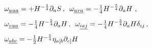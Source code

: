 \begin{equation}
\begin{array}{ll}
\omega _{%
\underline{u}\underline{u}\underline{a}}=+H^{-{\frac{1}{4}}}\partial _{a}S\,,\,\,\,
\omega _{\underline{uva}}=-{\frac{1}{4}}H^{-{\frac{5}{4}}}\partial _{a}H\,\,,\\[3mm]
 \omega _{\underline{vua}}=-\frac{1}{4}H^{-{\frac{5}{4}}}\partial _{a}H\,,\,\,\,
\omega _{\underline{iaj}}=-\frac{1}{4}H^{-{\frac{5}{4}}}\partial _{a}H\delta
_{ij}\,, \\[3mm]  \omega _{\underline{abc}}=-{\frac{1}{2}}H^{-{\frac{5}{4}}}\eta
_{a[b}\partial _{c]}H
\end{array}
\end{equation}

